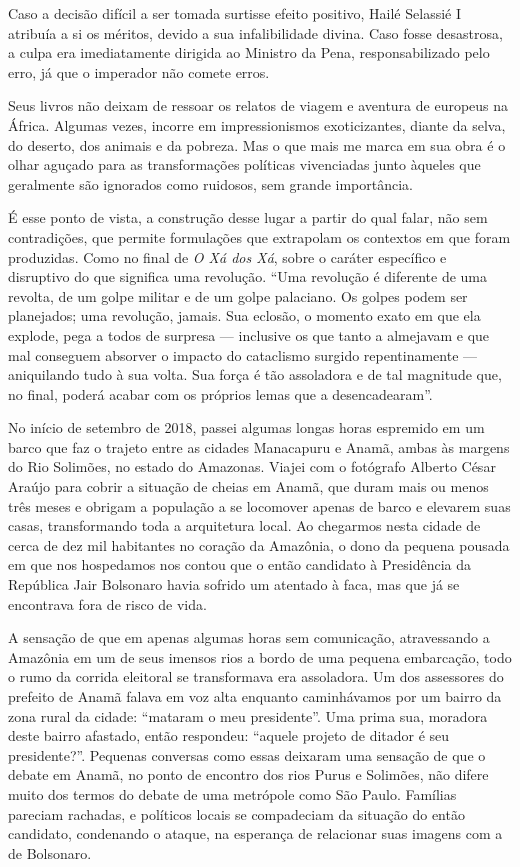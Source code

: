 Caso a decisão difícil a ser tomada surtisse efeito positivo, Hailé
Selassié I atribuía a si os méritos, devido a sua infalibilidade divina.
Caso fosse desastrosa, a culpa era imediatamente dirigida ao Ministro da
Pena, responsabilizado pelo erro, já que o imperador não comete erros.

Seus livros não deixam de ressoar os relatos de viagem e aventura de
europeus na África. Algumas vezes, incorre em impressionismos
exoticizantes, diante da selva, do deserto, dos animais e da pobreza.
Mas o que mais me marca em sua obra é o olhar aguçado para as
transformações políticas vivenciadas junto àqueles que geralmente são ignorados como ruidosos, sem grande
importância.

É esse ponto de vista, a construção desse lugar a partir do qual falar,
não sem contradições, que permite formulações que extrapolam os
contextos em que foram produzidas. Como no final de \emph{O Xá dos Xá},
sobre o caráter específico e disruptivo do que significa uma revolução.
``Uma revolução é diferente de uma revolta, de um golpe militar e de um
golpe palaciano. Os golpes podem ser planejados; uma revolução, jamais.
Sua eclosão, o momento exato em que ela explode, pega a todos de
surpresa --- inclusive os que tanto a almejavam e que mal conseguem
absorver o impacto do cataclismo surgido repentinamente --- aniquilando
tudo à sua volta. Sua força é tão assoladora e de tal magnitude que, no
final, poderá acabar com os próprios lemas que a desencadearam''.

\asterisc

No início de setembro de 2018, passei algumas longas horas espremido em
um barco que faz o trajeto entre as cidades Manacapuru e Anamã, ambas às
margens do Rio Solimões, no estado do Amazonas. Viajei com o fotógrafo
Alberto César Araújo para cobrir a situação de cheias em Anamã, que duram mais ou menos
três meses e obrigam a população a se locomover apenas de barco e
elevarem suas casas, transformando toda a arquitetura local. Ao
chegarmos nesta cidade de cerca de dez mil habitantes no coração da
Amazônia, o dono da pequena pousada em que nos hospedamos nos contou que o
então candidato à Presidência da República Jair Bolsonaro havia sofrido
um atentado à faca, mas que já se encontrava fora de risco de vida.

A sensação de que em apenas algumas horas sem comunicação, atravessando
a Amazônia em um de seus imensos rios a bordo de uma pequena embarcação,
todo o rumo da corrida eleitoral se transformava era assoladora. Um dos
assessores do prefeito de Anamã falava em voz alta enquanto caminhávamos por um
bairro da zona rural da cidade: ``mataram o meu presidente''. Uma prima
sua, moradora deste bairro afastado, então respondeu: ``aquele projeto
de ditador é seu presidente?''. Pequenas conversas como essas deixaram
uma sensação de que o debate em Anamã, no ponto de encontro dos rios
Purus e Solimões, não difere muito dos termos do debate de uma metrópole
como São Paulo. Famílias pareciam rachadas, e políticos locais se
compadeciam da situação do então candidato, condenando o ataque, na
esperança de relacionar suas imagens com a de Bolsonaro.

